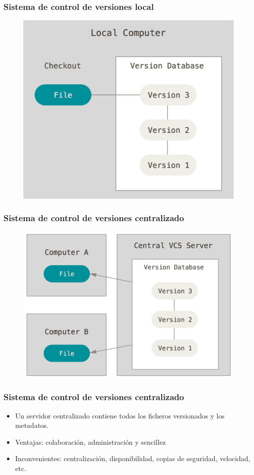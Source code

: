 \documentclass{beamer}
\begin{document}
\begin{frame}
\frametitle{Sistema de control de versiones local}
\begin{figure}
\includegraphics[width=0.50\linewidth]{img/local.png}
\end{figure}
\end{frame}

\begin{frame}
\frametitle{Sistema de control de versiones centralizado}
\begin{figure}
\includegraphics[width=0.50\linewidth]{img/centralized.png}
\end{figure}
\end{frame}

\begin{frame}
\frametitle{Sistema de control de versiones centralizado}
\begin{itemize}
\item Un servidor centralizado contiene todos los ficheros versionados y los metadatos.
\item Ventajas: colaboración, administración y sencillez
\item Inconvenientes: centralización, disponibilidad, copias de seguridad, velocidad, etc.
\end{itemize}
\end{frame}
\end{document}
